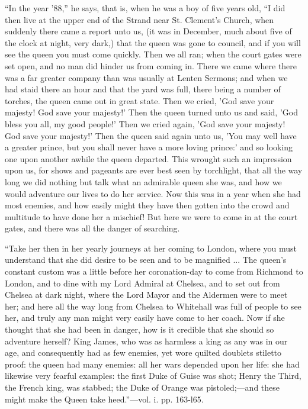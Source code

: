 ``In the year '88,'' he says, that is, when he was a
boy of five years old, ``I did then live at the upper end of the Strand
near St. Clement's Church, when suddenly there came a report unto
us, (it was in December, much about five of the clock at night, very
dark,) that the queen was gone to council, and if you will see the queen
you must come quickly. Then we all ran; when the court gates were set
open, and no man did hinder us from coming in. There we came where there
was a far greater company than was usually at Lenten Sermons; and when
we had staid there an hour and that the yard was full, there being a
number of torches, the queen came out in great state. Then we cried, 'God
save your majesty! God save your majesty!' Then the queen turned unto us
and said, 'God bless you all, my good people!' Then we cried again, 'God
save your majesty! God save your majesty!' Then the queen said again
unto us, 'You may well have a greater prince, but you shall never have a
more loving prince:' and so looking one upon another awhile the queen
departed. This wrought such an impression upon us, for shows and
pageants are ever best seen by torchlight, that all the way long we did
nothing but talk what an admirable queen she was, and how we would
adventure our lives to do her service. Now this was in a year when she
had most enemies, and how easily might they have then gotten into the
crowd and multitude to have done her a mischief! But here we were to
come in at the court gates, and there was all the danger of searching.

``Take her then in her yearly
journeys at her coming to London, where you must understand that she did
desire to be seen and to be magnified ... The queen's constant custom
was a little before her coronation-day to come from Richmond to London,
and to dine with my Lord Admiral at Chelsea, and to set out from Chelsea
at dark night, where the Lord Mayor and the Aldermen were to meet her;
and here all the way long from Chelsea to Whitehall was full of people
to see her, and truly any man might very easily have come to her coach.
Now if she thought that she had been in danger, how is it credible that
she should so adventure herself? King James, who was as harmless a king
as any was in our age, and consequently had as few enemies, yet wore
quilted doublets stiletto proof: the queen had many enemies: all her
wars depended upon her life: she had likewise very fearful examples: the
first Duke of Guise was shot; Henry the Third, the French king, was
stabbed; the Duke of Orange was pistoled;—and these might make the
Queen take heed.''—vol. i. pp. 163-l65.


